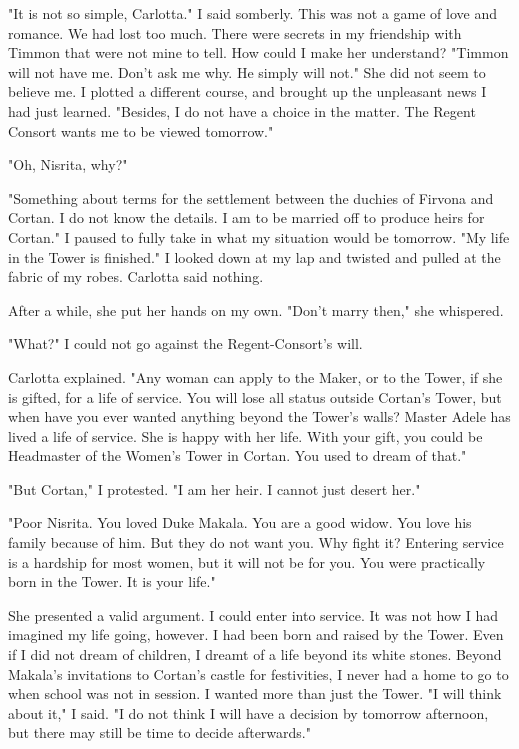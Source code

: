 \documentclass{article}
\begin{document}
"It is not so simple, Carlotta." I said somberly. This was not a game of love and romance. We had lost too much. There were secrets in my friendship with Timmon that were not mine to tell. How could I make her understand? "Timmon will not have me. Don't ask me why. He simply will not." She did not seem to believe me. I plotted a different course, and brought up the unpleasant news I had just learned. "Besides, I do not have a choice in the matter. The Regent Consort wants me to be viewed tomorrow."

"Oh, Nisrita, why?"

"Something about terms for the settlement between the duchies of Firvona and Cortan. I do not know the details. I am to be married off to produce heirs for Cortan." I paused to fully take in what my situation would be tomorrow. "My life in the Tower is finished." I looked down at my lap and twisted and pulled at the fabric of my robes. Carlotta said nothing.

After a while, she put her hands on my own. "Don't marry then," she whispered.

"What?" I could not go against the Regent-Consort's will.

Carlotta explained. "Any woman can apply to the Maker, or to the Tower, if she is gifted, for a life of service. You will lose all status outside Cortan's Tower, but when have you ever wanted anything beyond the Tower's walls? Master Adele has lived a life of service. She is happy with her life. With your gift, you could be Headmaster of the Women's Tower in Cortan. You used to dream of that."

"But Cortan," I protested. "I am her heir. I cannot just desert her."

"Poor Nisrita. You loved Duke Makala. You are a good widow. You love his family because of him. But they do not want you. Why fight it? Entering service is a hardship for most women, but it will not be for you. You were practically born in the Tower. It is your life."

She presented a valid argument. I could enter into service. It was not how I had imagined my life going, however. I had been born and raised by the Tower. Even if I did not dream of children, I dreamt of a life beyond its white stones. Beyond Makala's invitations to Cortan's castle for festivities, I never had a home to go to when school was not in session. I wanted more than just the Tower. "I will think about it," I said. "I do not think I will have a decision by tomorrow afternoon, but there may still be time to decide afterwards."
\end{document}
